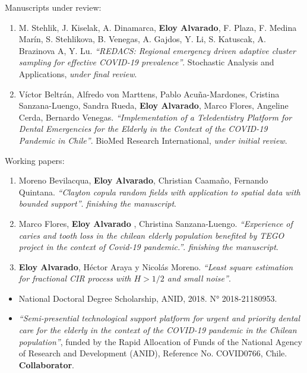 \documentclass[10pt,a4paper]{article}
\begin{document}
\headedsubsection 
{Manuscripts under review:}{}
{\begin{enumerate}
\item M. Stehlik, J. Kiselak, A. Dinamarca, \textbf{Eloy Alvarado}, F. Plaza, F. Medina Marín, S. Stehlikova, B. Venegas, A. Gajdos, Y. Li, S. Katuscak, A. Brazinova A, Y. Lu. \textit{``REDACS: Regional emergency driven adaptive cluster sampling for effective COVID-19 prevalence''}. Stochastic Analysis and Applications, \textit{under final review}.

\item Víctor Beltrán, Alfredo von Marttens, Pablo Acuña-Mardones, Cristina Sanzana-Luengo, Sandra Rueda, \textbf{Eloy Alvarado}, Marco Flores, Angeline Cerda, Bernardo Venegas. \textit{``Implementation of a Teledentistry Platform for Dental Emergencies for the Elderly in the Context of the COVID-19 Pandemic in Chile''}. BioMed Research International, \textit{under initial review}.
\end{enumerate}
}


\headedsubsection 
{Working papers:}{}
{\begin{enumerate}
\item Moreno Bevilacqua, \textbf{Eloy Alvarado}, Christian Caamaño, Fernando Quintana. \textit{``Clayton copula random fields with application to spatial data with bounded support''}. \textit{finishing the manuscript}.
\item Marco Flores, \textbf{Eloy Alvarado} , Christina Sanzana-Luengo. \textit{``Experience of caries and tooth loss in the chilean elderly population benefited by TEGO project in the context of Covid-19 pandemic.''}. \textit{finishing the manuscript}.
\item \textbf{Eloy Alvarado}, Héctor Araya y Nicolás Moreno. \textit{``Least square estimation for fractional CIR process with $H>1/2$ and small noise''}.
\end{enumerate}
}

\begin{itemize}
\item National Doctoral Degree Scholarship, ANID, 2018. N° 2018-21180953.
\item \textit{``Semi-presential technological support platform for urgent and
priority dental care for the elderly in the context of the COVID-19 pandemic in the Chilean population''}, funded by the Rapid Allocation of Funds of the National Agency of Research and
Development (ANID), Reference No. COVID0766, Chile. \textbf{Collaborator}.
\end{itemize}
\end{document}
